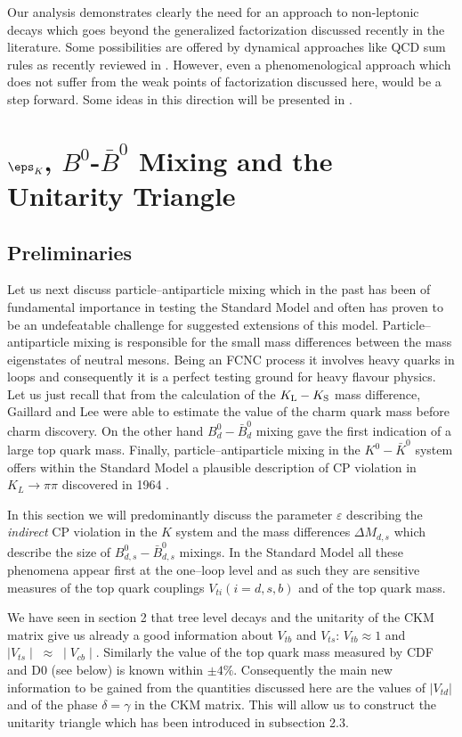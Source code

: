 Our analysis \cite{BUSI} demonstrates clearly the need for
an approach to non-leptonic decays which goes
beyond the generalized factorization discussed recently in
the literature. Some possibilities are offered by dynamical approaches
like QCD sum rules as recently reviewed in \cite{KR98}. 
However, even a phenomenological approach which does not suffer
from the weak points of factorization discussed here, would
be a step forward. Some ideas in this direction will be presented in
\cite{BUSI2}.

\section{$\eps_K$, $B^0$-$\bar B^0$ Mixing and the Unitarity Triangle}
        \label{sec:epsBBUT}
\setcounter{equation}{0}
\subsection{Preliminaries}
Let us next discuss particle--antiparticle mixing which in the past
 has been of fundamental
importance in testing the Standard Model and often has proven to be an
undefeatable challenge for suggested extensions of this model.
Particle--antiparticle mixing is responsible
for the small mass differences between the mass eigenstates of neutral
mesons. Being an FCNC process it involves heavy quarks in loops
and consequently it is a perfect 
testing ground for heavy flavour physics. Let us just recall that
 from the calculation of the
$K_{\rm L}-K_{\rm S}$ mass difference, Gaillard and Lee \cite{GALE} 
were able to estimate the
value of the charm quark mass before charm discovery. On the
other hand $B_d^0-\bar B_d^0$ mixing \cite{ARGUS} gave the first 
indication of a large top quark mass. 
Finally, particle--antiparticle mixing in the $K^0-\bar K^0$ system
offers within the Standard Model a plausible description of
CP violation in $K_L\to\pi\pi$ discovered in 1964 \cite{CRONIN}. 

In this section we will predominantly discuss  the parameter 
$\varepsilon$ 
describing the {\it indirect} CP violation in the $K$ system and  
the mass differences $\Delta M_{d,s}$  which
describe the size of $B_{d,s}^0-\bar B^0_{d,s}$ mixings. 
In the Standard Model all these phenomena
appear first at the one--loop level and as such they are
sensitive measures of the top quark couplings $V_{ti}(i=d,s,b)$ and 
of the top quark mass. 

We have seen in section 2 that tree level 
decays and the unitarity of the CKM
matrix give us already a good information about $V_{tb}$ and $V_{ts}$:
$V_{tb}\approx 1$ and $\mid V_{ts}\mid\;\approx\;\mid V_{cb}\mid$.
Similarly the value of the top quark mass measured by CDF and D0 (see below)
is known within $\pm 4\%$.
Consequently the
main new information to be gained from the quantities discussed here are 
the values of $|V_{td}|$ and of the phase $\delta=\gamma$ in the CKM matrix.
This will allow us to construct the unitarity triangle which has been 
introduced in subsection 2.3.

